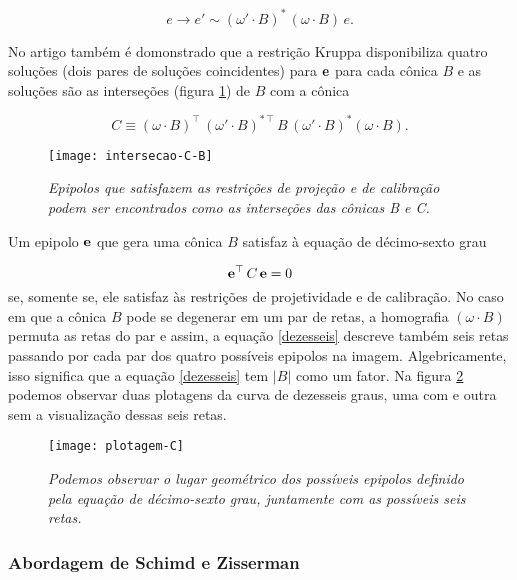 \begin{equation}
e \rightarrow e' \sim (\omega' \cdot B)^*\,(\omega \cdot B)\,e.
\end{equation}

No artigo também é domonstrado que a restrição Kruppa disponibiliza quatro soluções (dois pares de soluções coincidentes) para ${\bf e}$ para cada cônica $B$ e as soluções são as interseções (figura \ref{inter-B-C}) de $B$ com a cônica 

\begin{equation}
C \equiv (\omega \cdot B)^\top\,(\omega' \cdot B)^{*\,\top}\,B\,(\omega' \cdot B)^*(\omega \cdot B).
\end{equation}

\begin{figure}[!htb]
\centering
\texttt{[image: intersecao-C-B]}
\caption{\textit{Epipolos que satisfazem as restrições de projeção e de calibração podem ser encontrados como as interseções das cônicas B e C.}}
\label{inter-B-C}
\end{figure}

Um epipolo ${\bf e}$ que gera uma cônica $B$ satisfaz à equação de décimo-sexto grau

\begin{equation}
{\bf e}^\top\,C\,{\bf e} = 0
\label{dezesseis}
\end{equation}
se, somente se, ele satisfaz às restrições de projetividade e de calibração. No caso em que a cônica $B$ pode se degenerar em um par de retas, a homografia $(\omega \cdot B)$ permuta as retas do par e assim, a equação \ref{dezesseis} descreve também seis retas passando por cada par dos quatro possíveis epipolos na imagem. Algebricamente, isso significa que a equação \ref{dezesseis} tem $|B|$ como um fator. Na figura \ref{plot-C} podemos observar duas plotagens da curva de dezesseis graus, uma com e outra sem a visualização dessas seis retas.

\begin{figure}[!htb]
\centering
\texttt{[image: plotagem-C]}
\caption{\textit{Podemos observar o lugar geométrico dos possíveis epipolos definido pela equação de décimo-sexto grau, juntamente com as possíveis seis retas.}}
\label{plot-C}
\end{figure}





\subsubsection{Abordagem de Schimd e Zisserman}

